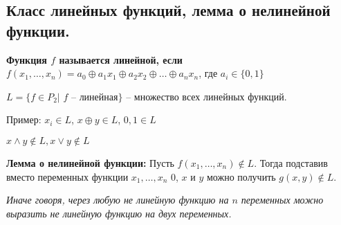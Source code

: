 \subsection{Класс линейных функций, лемма о нелинейной функции.}

\textbf{Функция $f$ называется линейной, если} $f(x_1,\ldots, x_n) = a_0 \oplus a_1x_1 \oplus a_2x_2 \oplus \ldots \oplus a_nx_n$, где $a_i \in \{0, 1\}$

$L = \{f \in P_2 |$ $f$ -- линейная$\}$ -- множество всех линейных функций.

Пример: $x_i \in L$, $x \oplus y \in L$, $0, 1 \in L$

$x \wedge y \notin L, x \vee y \notin L$

\textbf{Лемма о нелинейной функции:} Пусть $f(x_1, \ldots, x_n) \notin L$. Тогда подставив вместо переменных функции $x_1, \ldots, x_n$ 0, $x$ и $y$ можно получить $g(x, y) \notin L$.

\textit{Иначе говоря, через любую не линейную функцию на $n$ переменных можно выразить не линейную функцию на двух переменных.}
